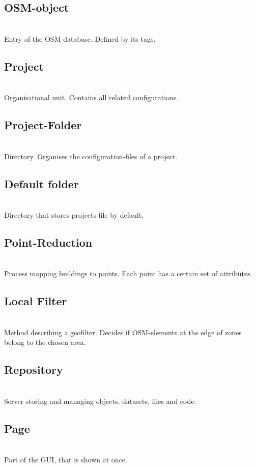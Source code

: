 \documentclass[parskip=full]{scrartcl} %
\begin{document}
\subsection{OSM-object}\\
Entry of the OSM-database. Defined by its tags.

\subsection{Project}\\
Organisational unit. Contains all related configurations.

\subsection{Project-Folder}\\
Directory. Organises the configuration-files of a project.

\subsection{Default folder}\\
Directory that stores projects file by default.

\subsection{Point-Reduction}\\
Process mapping buildings to points. Each point has a certain set of attributes.

\subsection{Local Filter}\\
Method describing a geofilter. Decides if OSM-elements at the edge of zones belong to the chosen area. 

\subsection{Repository}\\
Server storing and managing objects, datasets, files and code.

\subsection{Page}\\
Part of the GUI, that is shown at once.
\end{document}

